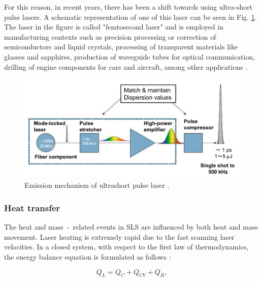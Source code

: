 For this reason, in recent years, there has been a shift towards using ultra-short pulse lasers. A schematic representation of one of this laser can be seen in Fig. \ref{fig:duripoco}. The laser in the figure is called "femtosecond laser" and is employed in manufacturing contexts such as precision processing or correction of semiconductors and liquid crystals, processing of transparent materials like glasses and sapphires, production of waveguide tubes for optical communication, drilling of engine components for cars and aircraft, among other applications \cite{katayama_fundamentals_2020}.
\begin{figure}
    \centering
    \includegraphics[scale=0.4]{Images/duripoco.png}
    \caption[Ultrashort pulse laser.]{Emission mechanism of ultrashort pulse laser \cite{katayama_fundamentals_2020}.}
    \label{fig:duripoco}
\end{figure}

\subsubsection{Heat transfer}
\label{sssec:heattransfer}
The heat and mass~-~related events in SLS are influenced by both heat and mass movement. Laser heating is extremely rapid due to the fast scanning laser velocities. In a closed system, with respect to the first law of thermodynamics, the energy balance equation is formulated as follows \cite{bouabbou_understanding_2022}:

\begin{equation}
    \label{eq:tutteQ}
    Q_L = Q_C + Q_{CV} + Q_R,
\end{equation}


